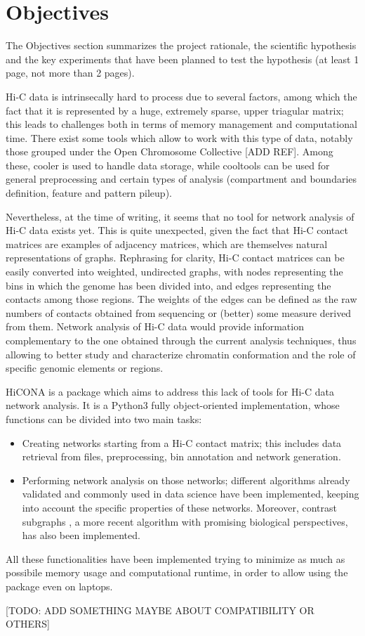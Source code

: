 \graphicspath{{chapters/03_objectives/}}
\chapter{Objectives}

The Objectives section summarizes the project rationale, the scientific hypothesis and the
key experiments that have been planned to test the hypothesis (at least 1 page, not more than
2 pages).

Hi-C data is intrinsecally hard to process due to several factors, among which the fact that it is represented by a huge, extremely sparse, upper triagular matrix; this leads to challenges both in terms of memory management and computational time. There exist some tools which allow to work with this type of data, notably those grouped under the Open Chromosome Collective [ADD REF]. Among these, cooler \cite{cooler2020} is used to handle data storage, while cooltools \cite{cooltools2022} can be used for general preprocessing and certain types of analysis (compartment and boundaries definition, feature and pattern pileup). 

Nevertheless, at the time of writing, it seems that no tool for network analysis of Hi-C data exists yet. This is quite unexpected, given the fact that Hi-C contact matrices are examples of adjacency matrices, which are themselves natural representations of graphs. Rephrasing for clarity, Hi-C contact matrices can be easily converted into weighted, undirected graphs, with nodes representing the bins in which the genome has been divided into, and edges representing the contacts among those regions. The weights of the edges can be defined as the raw numbers of contacts obtained from sequencing or (better) some measure derived from them. Network analysis of Hi-C data would provide information complementary to the one obtained through the current analysis techniques, thus allowing to better study and characterize chromatin conformation and the role of specific genomic elements or regions. 

HiCONA is a package which aims to address this lack of tools for Hi-C data network analysis. It is a Python3 fully object-oriented implementation, whose functions can be divided into two main tasks:
\begin{itemize}\tightlist
  \item Creating networks starting from a Hi-C contact matrix; this includes data retrieval from files, preprocessing, bin annotation and network generation.
  \item Performing network analysis on those networks; different algorithms already validated and commonly used in data science have been implemented, keeping into account the specific properties of these networks. Moreover, contrast subgraphs \cite{contrast2020, contrast2023}, a more recent algorithm with promising biological perspectives, has also been implemented.
\end{itemize}

All these functionalities have been implemented trying to minimize as much as possibile memory usage and computational runtime, in order to allow using the package even on laptops.

[TODO: ADD SOMETHING MAYBE ABOUT COMPATIBILITY OR OTHERS]
